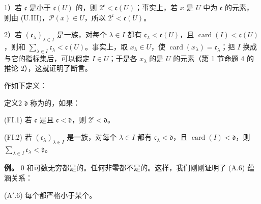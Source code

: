 1）若 $\mathfrak{c}$ 是小于 $\mathfrak{c}(U)$ 的，则 $2^{\mathfrak{c}}<\mathfrak{c}(U)$；事实上，若 $x$ 是 $U$ 中为 $\mathfrak{c}$ 的元素，则由 (U.III)，$\mathcal P(x)\in U$，所以 $2^{\mathfrak{c}}<\mathfrak{c}(U)$。

2）若 $(\mathfrak{c}_\lambda)_{\lambda\in I}$ 是一族，对每个 $\lambda\in I$ 都有 $\mathfrak{c}_\lambda<\mathfrak{c}(U)$，且 $\operatorname{card}(I)<\mathfrak{c}(U)$，则和 $\sum_{\lambda\in I}\mathfrak{c}_\lambda<\mathfrak{c}(U)$。事实上，取 $x_\lambda\in U$，使 $\operatorname{card}(x_\lambda)=\mathfrak{c}_\lambda$；把 $I$ 换成与它的指标集后，可以假定 $I\in U$；于是各 $x_\lambda$ 的是 $U$ 的元素（第 1 节命题 4 的推论 2），这就证明了断言。

作如下定义：
\begin{SGAresult}{定义}{2}
 $\mathfrak{d}$ 称为的，如果：

(FI.1) 若 $\mathfrak{c}$ 是且 $\mathfrak{c}<\mathfrak{d}$，则 $2^{\mathfrak{c}}<\mathfrak{d}$。

(FI.2) 若 $(\mathfrak{c}_\lambda)_{\lambda\in I}$ 是一族，对每个 $\lambda\in I$ 都有 $\mathfrak{c}_\lambda<\mathfrak{d}$，且 $\operatorname{card}(I)<\mathfrak{d}$，则 $\sum_{\lambda\in I}\mathfrak{c}_\lambda<\mathfrak{d}$。
\end{SGAresult}
\textbf{例。} $0$ 和可数无穷都是的。任何非零都不是的。这样，我们刚刚证明了 (A.6) 蕴涵关系：

(A$'$.6) 每个都严格小于某个。

